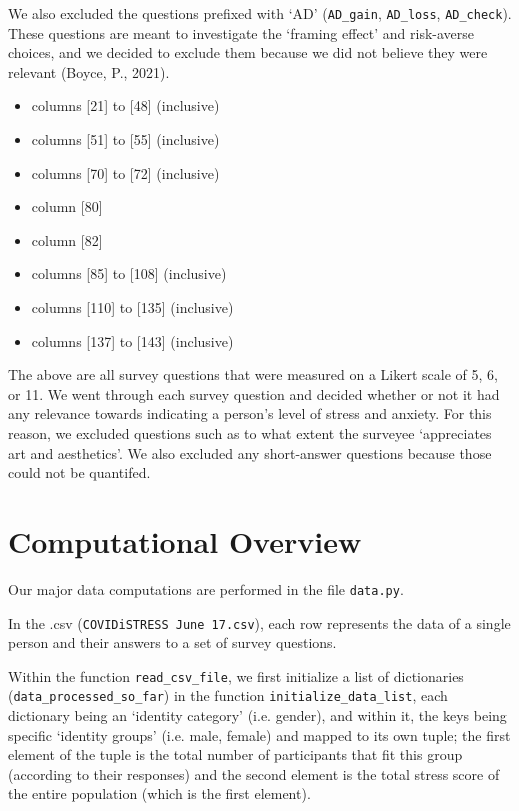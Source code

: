 \documentclass[fontsize=11pt]{article}
\begin{document}
    We also excluded the questions prefixed with ‘AD’ (\texttt{AD\_gain}, \texttt{AD\_loss}, \texttt{AD\_check}). These questions are meant to investigate the ‘framing effect’ and risk-averse choices, and we decided to exclude them because we did not believe they were relevant (Boyce, P., 2021).
	\begin{itemize}
		\item columns [21] to [48] (inclusive)
		\item columns [51] to [55] (inclusive)
		\item columns [70] to [72] (inclusive)
		\item column [80]
		\item column [82]
		\item columns [85] to [108] (inclusive)
		\item columns [110] to [135] (inclusive)
		\item columns [137] to [143] (inclusive)
	\end{itemize}

    The above are all survey questions that were measured on a Likert scale of 5, 6, or 11. We went through each survey question and decided whether or not it had any relevance towards indicating a person’s level of stress and anxiety. For this reason, we excluded questions such as to what extent the surveyee ‘appreciates art and aesthetics’. We also excluded any short-answer questions because those could not be quantifed.

    \section*{Computational Overview}
	
	Our major data computations are performed in the file \texttt{data.py}. 
	
	In the .csv (\texttt{COVIDiSTRESS June 17.csv}), each row represents the data of a single person and their answers to a set of survey questions.
	
	Within the function \texttt{read\_csv\_file}, we first initialize a list of dictionaries (\texttt{data\_processed\_so\_far}) in the function \texttt{initialize\_data\_list}, each dictionary being an ‘identity category’ (i.e. gender), and within it, the keys being specific ‘identity groups’ (i.e. male, female) and mapped to its own tuple; the first element of the tuple is the total number of participants that fit this group (according to their responses) and the second element is the total stress score of the entire population (which is the first element).
	
\end{document}

